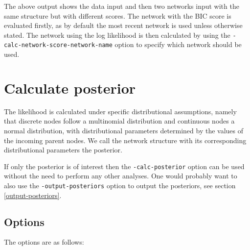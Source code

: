 \documentclass[a4paper,12pt]{article}
\newcommand{\code}[1]{{\footnotesize{{\tt #1}}}}
\begin{document}
The above output shows the data input and then two networks input with the same structure but with different scores. The network with the BIC score is evaluated firstly, as by default the most recent network is used unless otherwise stated. The network using the log likelihood is then calculated by using the \code{-calc-network-score-network-name} option to specify which network should be used. 




\section{Calculate posterior}
\label{calc-posterior}

The likelihood is calculated under specific distributional assumptions, namely that discrete nodes follow a multinomial distribution and continuous nodes a normal distribution, with distributional parameters determined by the values of the incoming parent nodes. We call the network structure with its corresponding distributional parameters the posterior. 

If only the posterior is of interest then the \code{-calc-posterior} option can be used without the need to perform any other analyses. One would probably want to also use the \code{-output-posteriors} option to output the posteriors, see  section \ref{output-posteriors}. 
\subsection{Options}
\label{calc-posterior-options}

The options are as follows: 

{\begin{center}\end{center}}
\end{document}
